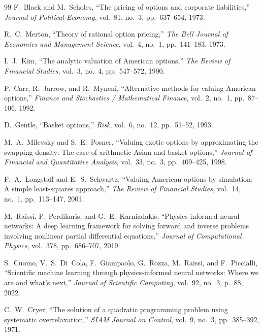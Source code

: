 \documentclass[11pt,a4paper]{article}
\begin{document}
\begin{thebibliography}{99}
F.~Black and M.~Scholes, ``The pricing of options and corporate liabilities,'' \emph{Journal of Political Economy}, vol.~81, no.~3, pp.~637--654, 1973.

R.~C.~Merton, ``Theory of rational option pricing,'' \emph{The Bell Journal of Economics and Management Science}, vol.~4, no.~1, pp.~141--183, 1973.

I.~J.~Kim, ``The analytic valuation of American options,'' \emph{The Review of Financial Studies}, vol.~3, no.~4, pp.~547--572, 1990.

P.~Carr, R.~Jarrow, and R.~Myneni, ``Alternative methods for valuing American options,'' \emph{Finance and Stochastics / Mathematical Finance}, vol.~2, no.~1, pp.~87--106, 1992.

D.~Gentle, ``Basket options,'' \emph{Risk}, vol.~6, no.~12, pp.~51--52, 1993.

M.~A.~Milevsky and S.~E.~Posner, ``Valuing exotic options by approximating the swapping density: The case of arithmetic Asian and basket options,'' \emph{Journal of Financial and Quantitative Analysis}, vol.~33, no.~3, pp.~409--425, 1998.

F.~A.~Longstaff and E.~S.~Schwartz, ``Valuing American options by simulation: A simple least-squares approach,'' \emph{The Review of Financial Studies}, vol.~14, no.~1, pp.~113--147, 2001.

M.~Raissi, P.~Perdikaris, and G.~E.~Karniadakis, ``Physics-informed neural networks: A deep learning framework for solving forward and inverse problems involving nonlinear partial differential equations,'' \emph{Journal of Computational Physics}, vol.~378, pp.~686--707, 2019.

S.~Cuomo, V.~S.~Di~Cola, F.~Giampaolo, G.~Rozza, M.~Raissi, and F.~Piccialli, ``Scientific machine learning through physics-informed neural networks: Where we are and what's next,'' \emph{Journal of Scientific Computing}, vol.~92, no.~3, p.~88, 2022.

C.~W.~Cryer, ``The solution of a quadratic programming problem using systematic overrelaxation,'' \emph{SIAM Journal on Control}, vol.~9, no.~3, pp.~385--392, 1971.
\end{thebibliography}
\end{document}
